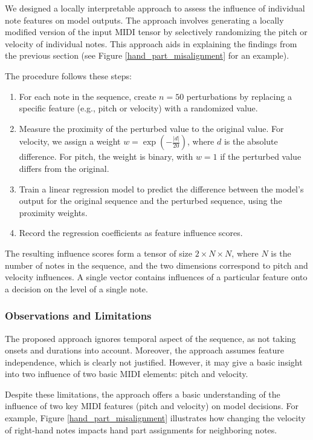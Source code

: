 We designed a locally interpretable approach to assess the influence of individual note features on model outputs. The approach involves generating a locally modified version of the input MIDI tensor by selectively randomizing the pitch or velocity of individual notes. This approach aids in explaining the findings from the previous section (see Figure \ref{hand_part_misalignment} for an example).

The procedure follows these steps:
\begin{enumerate}
	\item For each note in the sequence, create $n=50$ perturbations by replacing a specific feature (e.g., pitch or velocity) with a randomized value.
	\item Measure the proximity of the perturbed value to the original value. For velocity, we assign a weight $w=\exp\left(-\tfrac{|d|}{20}\right)$, where $d$ is the absolute difference. For pitch, the weight is binary, with $w=1$ if the perturbed value differs from the original.
	\item Train a linear regression model to predict the difference between the model's output for the original sequence and the perturbed sequence, using the proximity weights.
	\item Record the regression coefficients as feature influence scores. \end{enumerate}

The resulting influence scores form a tensor of size $2 \times N \times N$, where $N$ is the number of notes in the sequence, and the two dimensions correspond to pitch and velocity influences. A single vector contains influences of a particular feature onto a decision on the level of a single note.

\subsubsection{Observations and Limitations}

The proposed approach ignores temporal aspect of the sequence, as not taking onsets and durations into account. Moreover, the approach assumes feature independence, which is clearly not justified. However, it may give a basic insight into two influence of two basic MIDI elements: pitch and velocity.

Despite these limitations, the approach offers a basic understanding of the influence of two key MIDI features (pitch and velocity) on model decisions. For example, Figure \ref{hand_part_misalignment} illustrates how changing the velocity of right-hand notes impacts hand part assignments for neighboring notes.

